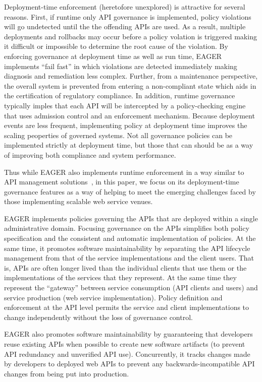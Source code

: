 Deployment-time enforcement (heretofore unexplored) is attractive for several
reasons.  First, if runtime only API governance is implemented, 
policy violations will go undetected until the the offending APIs are used.  
As a result, multiple deployments and rollbacks may occur before a policy
volation is triggered making it difficult or impossible to determine the root
cause of the violation.  By enforcing governance at deployment time as well as
run time, EAGER implements ``fail fast'' in which violations are detected
immediately making diagnosis and remediation less complex.  
Further, from a maintenance perspective,  the overall
system is prevented from entering a non-compliant state which aids in the
certification of regulatory compliance.  In addition, runtime governance
typically imples that each API will be intercepted by a policy-checking engine
that uses admission control and an enforcement mechanism.  Because deployment
events are less frequent, implementing policy at deployment time improves the
scaling peoperties of governed systems.   Not all governance policies can be
implemented strictly at deployment time, but those that can should be as a way
of improving both compliance and system performance.

Thus while
EAGER also implements runtime
enforcement in a way similar to API management
solutions~\cite{XXXWS02APImanager,XXX,XXX}, in this paper, we focus
on its deployment-time governance features as a way of helping to meet the
emerging challenges faced by those
implementing scalable web service venues. 

EAGER implements policies governing the APIs that are 
deployed within a single administrative domain.  Focusing governance on
the APIs simplifies both policy specification and the consistent
and automatic implementation of policies.  At the same time, it promotes
software maintainability by separating the API lifecycle management from that
of the service implementations and the client users.  That is, APIs are often
longer lived than the individual clients that use them or the implementations
of the services that they represent.  At the same time they represent the
``gateway'' between service consumption (API clients and users) and service
production (web service implementation).  Policy definition and enforcement at
the API level permits the service and client implementations to change
independently without the loss of governance control.

EAGER also promotes software maintainability by guaranteeing that 
developers reuse existing APIs when possible to create new software artifacts
(to prevent API redundancy and unverified API use). Concurrently, it
tracks changes made by developers to deployed web APIs to prevent
any backwards-incompatible API changes from being put into production.

